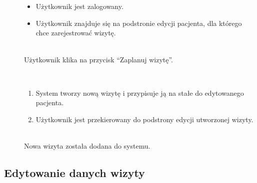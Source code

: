 \documentclass[11pt]{aghdpl}
\begin{document}
	\begin{description}
		\item[\useCaseAktor] \hfill \\
			\useCaseUzytkownik
		\item[\useCaseWarPocz] \hfill \\
			\begin{itemize}
				\item Użytkownik jest zalogowany.
				\item Użytkownik znajduje się na podstronie edycji pacjenta, dla którego chce zarejestrować wizytę.
			\end{itemize}
		\item[\useCaseZdarzInicj] \hfill \\
			Użytkownik klika na przycisk ``Zaplanuj wizytę''.
		\item[\useCaseScenBaz] \hfill \\ 
			\begin{enumerate}
				\item System tworzy nową wizytę i przypisuje ją na stałe do edytowanego pacjenta.
				\item Użytkownik jest przekierowany do podstrony edycji utworzonej wizyty.
			\end{enumerate}
		\item[\useCaseWarKonc] \hfill \\ 
			Nowa wizyta została dodana do systemu.
	\end{description}

\subsection{Edytowanie danych wizyty}
\end{document}
